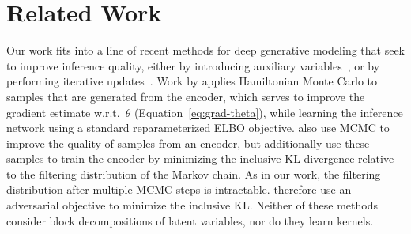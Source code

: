 \documentclass{article}
\theoremstyle{definition}
\begin{document}
\vspace{-1.5em}
\section{Related Work}
\vspace{-0.25em}

Our work fits into a line of recent methods for deep generative modeling that seek to improve inference quality, either by introducing auxiliary variables~\cite{maaloe2016auxiliary, ranganath2016hierarchical}, or by performing iterative updates~\cite{marino2018iterative}. 
Work by \citet{hoffman2017learning} applies Hamiltonian Monte Carlo to samples that are generated from the encoder, which serves to improve the gradient estimate w.r.t.~$\theta$ (Equation~\ref{eq:grad-theta}), while learning the inference network using a standard reparameterized ELBO objective. 
\citet{li2017approximate} also use MCMC to improve the quality of samples from an encoder, but additionally use these samples to train the encoder by minimizing the inclusive KL divergence relative to the filtering distribution of the Markov chain. As in our work, the filtering distribution after multiple MCMC steps is intractable. \citet{li2017approximate} therefore use an adversarial objective to minimize the inclusive KL. Neither of these methods consider block decompositions of latent variables, nor do they learn kernels. 
\end{document}
